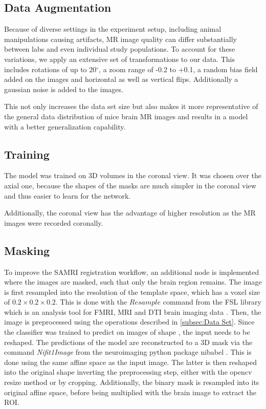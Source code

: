 \subsection{Data Augmentation} \label{Data Augmentation}

Because of diverse settings in the experiment setup, including animal manipulations causing artifacts, MR image quality can differ substantially between labs and even individual study populations.
To account for these variations, we apply an extensive set of transformations to our data.
This includes rotations of up to 20$^{\circ}$, a zoom range of -0.2 to +0.1, a random bias field added on the images and horizontal as well as vertical flips.
Additionally a gaussian noise is added to the images.

This not only increases the data set size but also makes it more representative of the general data distribution of mice brain MR images and results in a model with a better generalization capability.

\subsection{Training}
The model was trained on 3D volumes in the coronal view.
It was chosen over the axial one, because the shapes of the masks are much simpler in the coronal view and thus easier to learn for the network.

Additionally, the coronal view has the advantage of higher resolution as the MR images were recorded coronally.

\subsection{Masking}
To improve the SAMRI registration workflow, an additional node is implemented where the images are masked, such that only the brain region remains.
The image is first resampled into the resolution of the template space, which has a voxel size of $0.2\times 0.2 \times 0.2$.
This is done with the \textcolor{mg}{\texttt{$Resample$}} command from the FSL library which is an analysis tool for FMRI, MRI and DTI brain imaging data \cite{fsl}.
Then, the image is preprocessed using the operations described in \cref{subsec:Data Set}.
Since the classifier was trained to predict on images of shape , the input needs to be reshaped.
The predictions of the model are reconstructed to a 3D mask via the command \textit{Nifit1Image} from the neuroimaging python package nibabel \cite{noauthor_neuroimaging_nodate}.
This is done using the same affine space as the input image.
The latter is then reshaped into the original shape inverting the preprocessing step, either with the opencv resize method or by cropping.
Additionally, the binary mask is resampled into its original affine space, before being multiplied with the brain image to extract the ROI.

